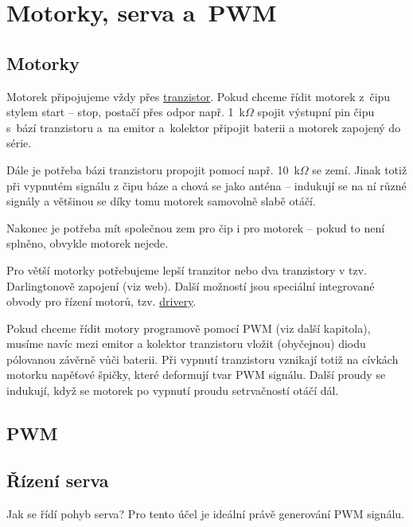 \section{Motorky, serva a~PWM}

\subsection{Motorky}

Motorek připojujeme vždy přes    \hyperlink{tranzistor}{tranzistor}. 
Pokud chceme řídit motorek z~čipu stylem start -- stop, postačí přes odpor 
např. 1~k$\Omega$ spojit výstupní pin čipu s~bází tranzistoru a~na emitor a~kolektor připojit baterii a motorek zapojený do série. 

Dále je potřeba bázi tranzistoru propojit pomocí např. 10~k$\Omega$ se zemí. 
Jinak totiž při vypnutém signálu z čipu báze  a chová se jako 
anténa -- indukují se na ní různé signály a většinou se díky tomu motorek samovolně slabě otáčí.   

Nakonec je potřeba mít společnou zem pro čip i pro motorek -- pokud to není splněno, obvykle motorek nejede. 

Pro větší motorky potřebujeme lepší tranzitor nebo dva tranzistory v tzv. Darlingtonově zapojení (viz web). 
Další možností jsou speciální integrované obvody pro řízení motorů, tzv.  
 \hyperref[driver]{drivery}.  

Pokud chceme řídit motory programově pomocí PWM (viz další kapitola), 
musíme navíc mezi emitor a kolektor tranzistoru vložit (obyčejnou) diodu pólovanou závěrně vůči baterii. 
Při vypnutí tranzistoru vznikají totiž na cívkách motorku napěťové špičky, které deformují tvar PWM signálu.  
Další proudy se indukují, když se motorek po vypnutí proudu setrvačností otáčí dál. 

\subsection{PWM}


\subsection{Řízení serva}

 Jak se řídí pohyb serva? Pro tento účel je ideální právě generování PWM signálu. 

